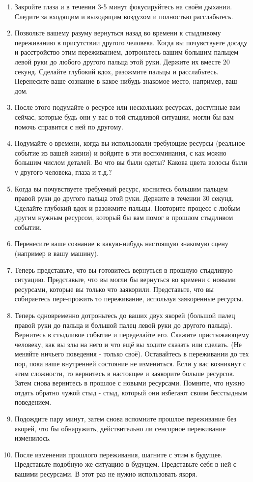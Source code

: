 \documentclass[10pt, fleqn]{article}
\begin{document}
\begin{enumerate}
\item Закройте глаза и в течении 3-5 минут фокусируйтесь на своём дыхании. Следите за входящим и выходящим воздухом и полностью расслабьтесь. 
\item Позвольте вашему разуму вернуться назад во времени к стыдливому переживанию в присутствии другого человека. Когда вы почувствуете досаду и расстройство этим переживанием, дотроньтесь вашим большим пальцем левой руки до любого другого пальца этой руки. Держите их вместе 20 секунд. Сделайте глубокий вдох, разожмите пальцы и расслабьтесь. Перенесите ваше сознание в какое-нибудь знакомое место, например, ваш дом.
\item После этого подумайте о ресурсе или нескольких ресурсах, доступные вам сейчас, которые будь они у вас в той стыдливой ситуации, могли бы вам помочь справится с ней по другому. 
\item Подумайте о времени, когда вы использовали требующие ресурсы (реальное событие из вашей жизни) и войдите в эти воспоминания, с как можно большим числом деталей. Во что вы были одеты? Какова цвета волосы были у другого человека, глаза и т.д.?
\item Когда вы почувствуете требуемый ресурс, коснитесь большим пальцем правой руки до другого пальца этой руки. Держите в течении 30 секунд. Сделайте глубокий вдох и разожмите пальцы. Повторите процесс с любым другим нужным ресурсом, который бы вам помог в прошлом стыдливом событии.
\item Перенесите ваше сознание в какую-нибудь настоящую знакомую сцену (например в вашу машину).
\item Теперь представьте, что вы готовитесь вернуться в прошлую стыдливую ситуацию. Представьте, что вы могли бы вернуться во времени с новыми ресурсами, которые вы только что заякорили. Представьте, что вы собираетесь пере-прожить то переживание, используя заякоренные ресурсы.
\item Теперь одновременно дотроньтесь до ваших двух якорей (большой палец правой руки до пальца и большой палец левой руки до другого пальца). Вернитесь в стыдливое событие и переделайте его. Скажите пристыжающему человеку, как вы злы на него и что ещё вы ходите сказать или сделать. (Не меняйте ничьего поведения - только своё). Оставайтесь в переживании до тех пор, пока ваше внутренней состояние не измениться. Если у вас возникнут с этим сложности, то вернитесь в настоящее и заякорите больше ресурсов. Затем снова вернитесь в прошлое с новыми ресурсами. Помните, что нужно отдать обратно чужой стыд - стыд, который они избегают своим бесстыдным поведением.
\item Подождите пару минут, затем снова вспомните прошлое переживание без якорей, что бы обнаружить, действительно ли сенсорное переживание изменилось.
\item После изменения прошлого переживания, шагните с этим в будущее. Представьте подобную же ситуацию в будущем. Представьте себя в ней с вашими ресурсами. В этот раз не нужно использовать якоря.
\end{enumerate}
\end{document}
